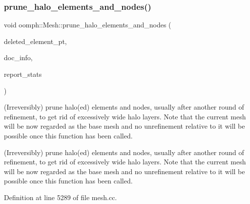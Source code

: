 \subsubsection{\texorpdfstring{prune\+\_\+halo\+\_\+elements\+\_\+and\+\_\+nodes()}{prune\_halo\_elements\_and\_nodes()}\hspace{0.1cm}{\footnotesize\ttfamily [2/2]}}
{\footnotesize\ttfamily void oomph\+::\+Mesh\+::prune\+\_\+halo\+\_\+elements\+\_\+and\+\_\+nodes (\begin{DoxyParamCaption}\item[{\hyperlink{classoomph_1_1Vector}{Vector}$<$ \hyperlink{classoomph_1_1GeneralisedElement}{Generalised\+Element} $\ast$$>$ \&}]{deleted\+\_\+element\+\_\+pt,  }\item[{\hyperlink{classoomph_1_1DocInfo}{Doc\+Info} \&}]{doc\+\_\+info,  }\item[{const bool \&}]{report\+\_\+stats }\end{DoxyParamCaption})}



(Irreversibly) prune halo(ed) elements and nodes, usually after another round of refinement, to get rid of excessively wide halo layers. Note that the current mesh will be now regarded as the base mesh and no unrefinement relative to it will be possible once this function has been called. 

(Irreversibly) prune halo(ed) elements and nodes, usually after another round of refinement, to get rid of excessively wide halo layers. Note that the current mesh will be now regarded as the base mesh and no unrefinement relative to it will be possible once this function has been called. 

Definition at line 5289 of file mesh.\+cc.



